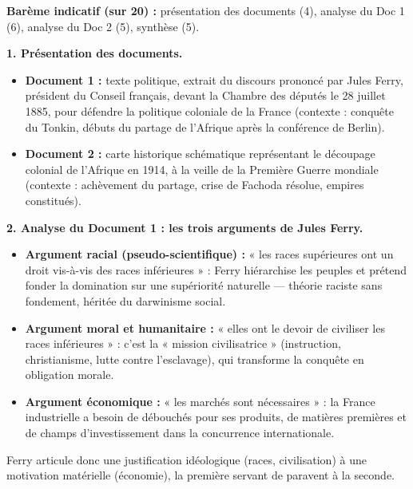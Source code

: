 \documentclass[11pt]{article}
\begin{document}
\begin{corrige}
\textbf{Barème indicatif (sur 20) :} présentation des documents (4), analyse du Doc 1 (6), analyse du Doc 2 (5), synthèse (5).

\textbf{1. Présentation des documents.}
\begin{itemize}
    \item \textbf{Document 1 :} texte politique, extrait du discours prononcé par Jules Ferry, président du Conseil français, devant la Chambre des députés le 28 juillet 1885, pour défendre la politique coloniale de la France (contexte : conquête du Tonkin, débuts du partage de l'Afrique après la conférence de Berlin).
    \item \textbf{Document 2 :} carte historique schématique représentant le découpage colonial de l'Afrique en 1914, à la veille de la Première Guerre mondiale (contexte : achèvement du partage, crise de Fachoda résolue, empires constitués).
\end{itemize}

\textbf{2. Analyse du Document 1 : les trois arguments de Jules Ferry.}
\begin{itemize}
    \item \textbf{Argument racial (pseudo-scientifique) :} « les races supérieures ont un droit vis-à-vis des races inférieures » : Ferry hiérarchise les peuples et prétend fonder la domination sur une supériorité naturelle — théorie raciste sans fondement, héritée du darwinisme social.
    \item \textbf{Argument moral et humanitaire :} « elles ont le devoir de civiliser les races inférieures » : c'est la « mission civilisatrice » (instruction, christianisme, lutte contre l'esclavage), qui transforme la conquête en obligation morale.
    \item \textbf{Argument économique :} « les marchés sont nécessaires » : la France industrielle a besoin de débouchés pour ses produits, de matières premières et de champs d'investissement dans la concurrence internationale.
\end{itemize}
Ferry articule donc une justification idéologique (races, civilisation) à une motivation matérielle (économie), la première servant de paravent à la seconde.


\end{corrige}
\end{document}
